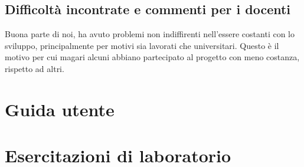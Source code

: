 \section{Difficoltà incontrate e commenti per i docenti}
Buona parte di noi, ha avuto problemi non indiffirenti nell'essere costanti con lo sviluppo, principalmente per motivi sia lavorati che universitari.
Questo è il motivo per cui magari alcuni abbiano partecipato al progetto con meno costanza, rispetto ad altri.

\appendix
\chapter{Guida utente}

\chapter{Esercitazioni di laboratorio}






